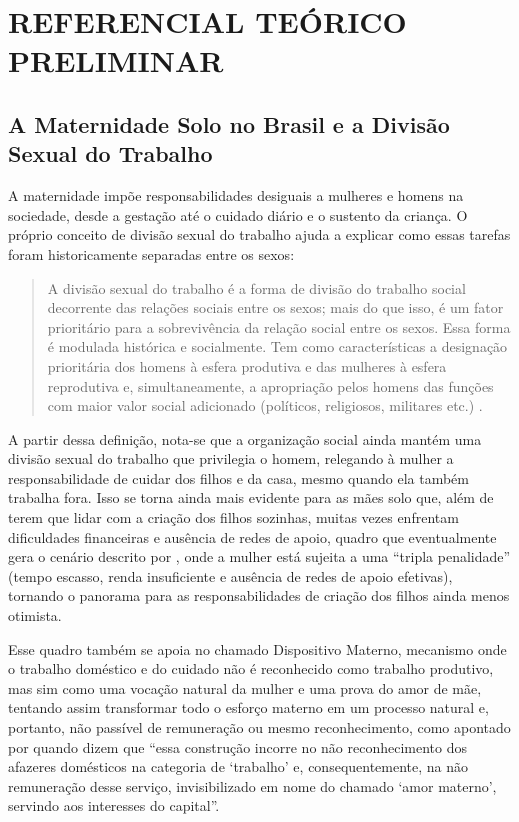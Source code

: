 \section{REFERENCIAL TEÓRICO PRELIMINAR}

\subsection{A Maternidade Solo no Brasil e a Divisão Sexual do Trabalho}
A maternidade impõe responsabilidades desiguais a mulheres e homens na sociedade, desde a gestação até o cuidado diário e o sustento da criança. O próprio conceito de divisão sexual do trabalho ajuda a explicar como essas tarefas foram historicamente separadas entre os sexos:

\begin{quote}
A divisão sexual do trabalho é a forma de divisão do trabalho social decorrente das relações sociais entre os sexos; mais do que isso, é um fator prioritário para a sobrevivência da relação social entre os sexos. Essa forma é modulada histórica e socialmente. Tem como características a designação prioritária dos homens à esfera produtiva e das mulheres à esfera reprodutiva e, simultaneamente, a apropriação pelos homens das funções com maior valor social adicionado (políticos, religiosos, militares etc.) \cite[599]{hirata2007}.
\end{quote}

A partir dessa definição, nota-se que a organização social ainda mantém uma divisão sexual do trabalho que privilegia o homem, relegando à mulher a responsabilidade de cuidar dos filhos e da casa, mesmo quando ela também trabalha fora. Isso se torna ainda mais evidente para as mães solo que, além de terem que lidar com a criação dos filhos sozinhas, muitas vezes enfrentam dificuldades financeiras e ausência de redes de apoio, quadro que eventualmente gera o cenário descrito por \textcite[5]{souza2024}, onde a mulher está sujeita a uma ``tripla penalidade'' (tempo escasso, renda insuficiente e ausência de redes de apoio efetivas), tornando o panorama para as responsabilidades de criação dos filhos ainda menos otimista.

Esse quadro também se apoia no chamado Dispositivo Materno, mecanismo onde o trabalho doméstico e do cuidado não é reconhecido como trabalho produtivo, mas sim como uma vocação natural da mulher e uma prova do amor de mãe, tentando assim transformar todo o esforço materno em um processo natural e, portanto, não passível de remuneração ou mesmo reconhecimento, como apontado por \textcite[2]{araujo2025} quando dizem que ``essa construção incorre no não reconhecimento dos afazeres domésticos na categoria de `trabalho' e, consequentemente, na não remuneração desse serviço, invisibilizado em nome do chamado `amor materno', servindo aos interesses do capital''.

